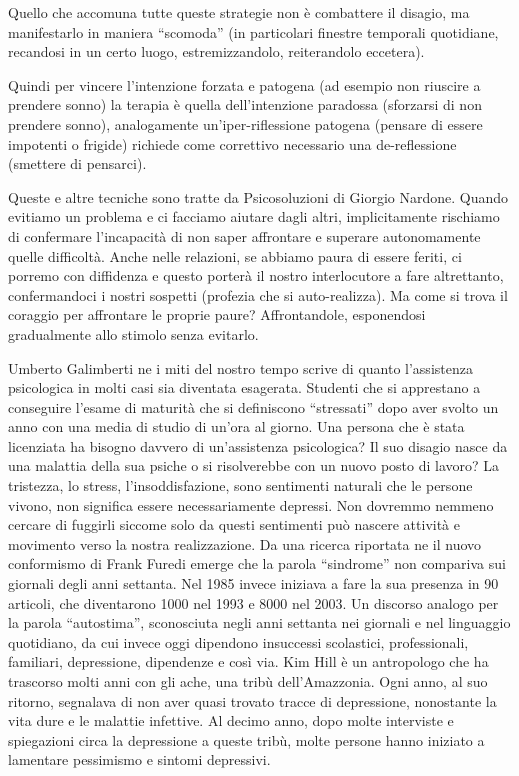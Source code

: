 \documentclass[12pt]{book} %
\begin{document}
\begin{mdframed}[linewidth=1pt]
Quello che accomuna tutte queste strategie non è combattere il disagio, ma manifestarlo in maniera “scomoda” (in
particolari finestre temporali quotidiane, recandosi in un certo luogo, estremizzandolo, reiterandolo eccetera).

Quindi per vincere l'intenzione forzata e patogena (ad esempio non riuscire a prendere sonno) la
terapia è quella dell'intenzione paradossa (sforzarsi di non prendere sonno), analogamente
un'iper-riflessione patogena (pensare di essere impotenti o frigide) richiede come correttivo
necessario una de-reflessione (smettere di pensarci).

Queste e altre tecniche sono tratte da Psicosoluzioni di Giorgio Nardone. 
Quando evitiamo un problema e ci facciamo aiutare dagli altri, implicitamente rischiamo di confermare l'incapacità di non saper affrontare e superare autonomamente quelle difficoltà. Anche nelle relazioni, se abbiamo paura di essere feriti, ci porremo con diffidenza e questo porterà il
nostro interlocutore a fare altrettanto, confermandoci i nostri sospetti (profezia che si auto-realizza). Ma come si
trova il coraggio per affrontare le proprie paure? Affrontandole, esponendosi gradualmente allo stimolo senza evitarlo.
\end{mdframed}

\begin{mdframed}[linewidth=1pt]
Umberto Galimberti ne i miti del nostro tempo scrive di quanto
l'assistenza psicologica in molti casi sia diventata esagerata. Studenti che si apprestano a
conseguire l'esame di maturità che si definiscono “stressati” dopo aver svolto un anno con una
media di studio di un'ora al giorno. Una persona che è stata licenziata ha bisogno davvero di
un'assistenza psicologica? Il suo disagio nasce da una malattia della sua psiche o si risolverebbe
con un nuovo posto di lavoro? La tristezza, lo stress, l'insoddisfazione, sono sentimenti naturali che le persone vivono, non significa essere necessariamente depressi. Non dovremmo nemmeno cercare di fuggirli siccome solo da questi
sentimenti può nascere attività e movimento verso la nostra realizzazione. Da una ricerca riportata ne il nuovo
conformismo di Frank
Furedi emerge che la parola “sindrome” non compariva sui giornali degli anni settanta. Nel 1985 invece iniziava a fare
la sua presenza in 90 articoli, che diventarono 1000 nel 1993 e 8000 nel 2003. Un discorso analogo per la parola
“autostima”, sconosciuta negli anni settanta nei giornali e nel linguaggio quotidiano, da cui invece oggi dipendono
insuccessi scolastici, professionali, familiari, depressione, dipendenze e così via. Kim Hill è un
antropologo che ha trascorso molti anni con gli ache, una tribù dell'Amazzonia. Ogni anno, al suo
ritorno, segnalava di non aver quasi trovato tracce di depressione, nonostante la vita dure e le malattie infettive. Al
decimo anno, dopo molte interviste e spiegazioni circa la depressione a queste tribù, molte persone hanno iniziato a
lamentare pessimismo e sintomi depressivi.
\end{mdframed}
\end{document}
